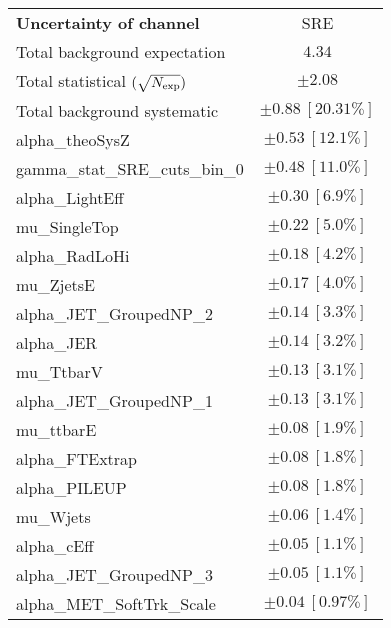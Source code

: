 
\begin{table}
\begin{center}
\setlength{\tabcolsep}{0.0pc}
\begin{tabular*}{\textwidth}{@{\extracolsep{\fill}}lc}
\noalign{\smallskip}\hline\noalign{\smallskip}
{\bf Uncertainty of channel}                                    & SRE            \\
\noalign{\smallskip}\hline\noalign{\smallskip}
Total background expectation             &  $4.34$       \\
\noalign{\smallskip}\hline\noalign{\smallskip}
Total statistical $(\sqrt{N_{\rm exp}})$              & $\pm 2.08$       \\
Total background systematic               & $\pm 0.88\ [20.31\%] $             \\
\noalign{\smallskip}\hline\noalign{\smallskip}
\noalign{\smallskip}\hline\noalign{\smallskip}
alpha\_theoSysZ         & $\pm 0.53\ [12.1\%] $       \\
gamma\_stat\_SRE\_cuts\_bin\_0         & $\pm 0.48\ [11.0\%] $       \\
alpha\_LightEff         & $\pm 0.30\ [6.9\%] $       \\
mu\_SingleTop         & $\pm 0.22\ [5.0\%] $       \\
alpha\_RadLoHi         & $\pm 0.18\ [4.2\%] $       \\
mu\_ZjetsE         & $\pm 0.17\ [4.0\%] $       \\
alpha\_JET\_GroupedNP\_2         & $\pm 0.14\ [3.3\%] $       \\
alpha\_JER         & $\pm 0.14\ [3.2\%] $       \\
mu\_TtbarV         & $\pm 0.13\ [3.1\%] $       \\
alpha\_JET\_GroupedNP\_1         & $\pm 0.13\ [3.1\%] $       \\
mu\_ttbarE         & $\pm 0.08\ [1.9\%] $       \\
alpha\_FTExtrap         & $\pm 0.08\ [1.8\%] $       \\
alpha\_PILEUP         & $\pm 0.08\ [1.8\%] $       \\
mu\_Wjets         & $\pm 0.06\ [1.4\%] $       \\
alpha\_cEff         & $\pm 0.05\ [1.1\%] $       \\
alpha\_JET\_GroupedNP\_3         & $\pm 0.05\ [1.1\%] $       \\
alpha\_MET\_SoftTrk\_Scale         & $\pm 0.04\ [0.97\%] $       \\

\end{tabular*}
\end{center}
\end{table}
